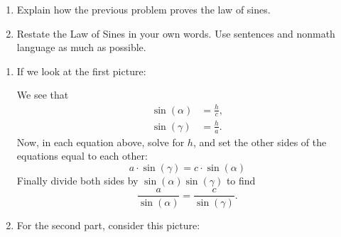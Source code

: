 \documentclass[noauthor,nooutcomes,handout,hints]{../ximera}
\begin{document}
\begin{question}
\begin{question}
\begin{enumerate}
 \item Explain how the previous problem proves the law of sines.
 \item Restate the Law of Sines in your own words. Use sentences and nonmath language as much as possible.
\end{enumerate}


\end{question}

  \begin{freeResponse}
    \begin{enumerate}
    \item If we look at the first picture:
      \begin{center}
    \end{center}
    We see that
    \begin{align*}
      \sin(\alpha) &= \frac{h}{c},\\
      \sin(\gamma) &= \frac{h}{a}.
    \end{align*}
    Now, in each equation above, solve for $h$, and set the other
    sides of the equations equal to each other:
    \[
    a\cdot \sin(\gamma)=c\cdot \sin(\alpha)
    \]
    Finally divide both sides by $\sin(\alpha)\sin(\gamma)$ to find
    \[
    \frac{a}{\sin(\alpha)} = \frac{c}{\sin(\gamma)}.
    \]

    \item For the second part, consider this picture:
    \begin{center}
\end{center}
\end{enumerate}
\end{freeResponse}
\end{question}
\end{document}
